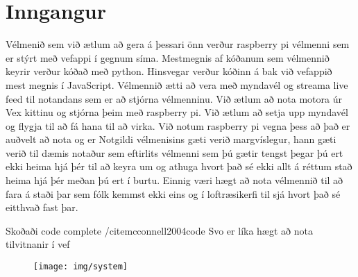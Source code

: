 \section{Inngangur}
Vélmenið sem við ætlum að gera á þessari önn verður raspberry pi vélmenni sem er stýrt með vefappi í gegnum síma. Mestmegnis af kóðanum sem vélmennið keyrir verður kóðað með python. Hinsvegar verður kóðinn á bak við vefappið mest megnis í JavaScript. Vélmennið ætti að vera með myndavél og streama live feed til notandans sem er að stjórna vélmenninu. Við ætlum að nota motora úr Vex kittinu og stjórna þeim með raspberry pi. Við ætlum að setja upp myndavél og flygja \cite{prasad2014smart} til að fá hana til að virka. Við notum raspberry pi vegna þess að það er auðvelt að nota og er 
Notgildi vélmenisins gæti verið margvíslegur, hann gæti verið til dæmis notaður sem eftirlits vélmenni sem þú gætir tengst þegar þú ert ekki heima hjá þér til að keyra um og athuga hvort það sé ekki allt á réttum stað heima hjá þér meðan þú ert í burtu. Einnig væri hægt að nota vélmennið til að fara á staði þar sem fólk kemmst ekki eins og í loftræsikerfi til sjá hvort það sé eitthvað fast þar.



Skoðaði code complete /cite{mcconnell2004code}
Svo er líka hægt að nota tilvitnanir í vef \cite{WinNT}
\begin{figure}[h]
\texttt{[image: img/system]}
\end{figure}